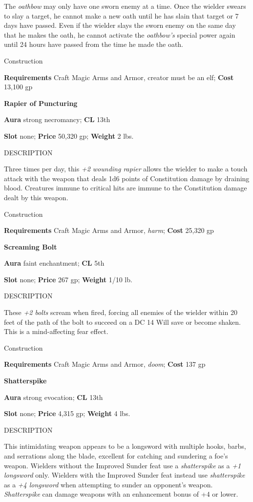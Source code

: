 The \textit{oathbow} may only have one sworn enemy at a time. Once the wielder swears to slay a target, he cannot make a new oath until he has slain that target or 7 days have passed. Even if the wielder slays the sworn enemy on the same day that he makes the oath, he cannot activate the \textit{oathbow's} special power again until 24 hours have passed from the time he made the oath. 
				
Construction
				
\textbf{Requirements} Craft Magic Arms and Armor, creator must be an elf; \textbf{Cost }13,100 gp
				
\textbf{Rapier of Puncturing}
				
\textbf{Aura} strong necromancy;\textbf{ CL }13th
				
\textbf{Slot} none; \textbf{Price} 50,320 gp; \textbf{Weight} 2 lbs.
				
DESCRIPTION
				
Three times per day, this \textit{+2 wounding rapier} allows the wielder to make a touch attack with the weapon that deals 1d6 points of Constitution damage by draining blood. Creatures immune to critical hits are immune to the Constitution damage dealt by this weapon. 
				
Construction
				
\textbf{Requirements} Craft Magic Arms and Armor, \textit{harm}; \textbf{Cost }25,320 gp
				
\textbf{Screaming Bolt}
				
\textbf{Aura} faint enchantment;\textbf{ CL }5th
				
\textbf{Slot} none; \textbf{Price} 267 gp; \textbf{Weight} 1/10 lb.
				
DESCRIPTION
				
These \textit{+2 bolts} scream when fired, forcing all enemies of the wielder within 20 feet of the path of the bolt to succeed on a DC 14 Will save or become shaken. This is a mind-affecting fear effect. 
				
Construction
				
\textbf{Requirements} Craft Magic Arms and Armor, \textit{doom}; \textbf{Cost }137 gp
				
\textbf{Shatterspike}
				
\textbf{Aura} strong evocation;\textbf{ CL }13th
				
\textbf{Slot} none; \textbf{Price} 4,315 gp; \textbf{Weight} 4 lbs.
				
DESCRIPTION
				
This intimidating weapon appears to be a longsword with multiple hooks, barbs, and serrations along the blade, excellent for catching and sundering a foe's weapon. Wielders without the Improved Sunder feat use a \textit{shatterspike} as a \textit{+1 longsword} only. Wielders with the Improved Sunder feat instead use \textit{shatterspike} as a \textit{+4 longsword} when attempting to sunder an opponent's weapon. \textit{Shatterspike} can damage weapons with an enhancement bonus of +4 or lower.
				
